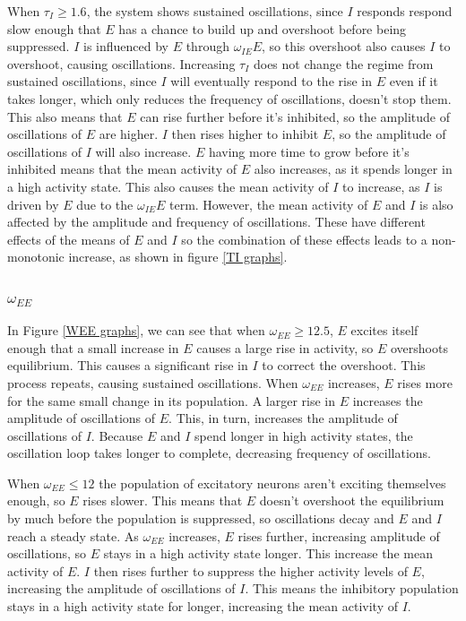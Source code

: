 \documentclass[10pt]{article}
\begin{document}
\begin{flushleft}
When $\tau_I \geq 1.6$, the system shows sustained oscillations, since $I$ responds respond slow enough that $E$ has a chance to build up and overshoot before being suppressed. $I$ is influenced by $E$ through $\omega_{IE}E$, so this overshoot also causes $I$ to overshoot, causing oscillations. Increasing $\tau_I$ does not change the regime from sustained oscillations, since $I$ will eventually respond to the rise in $E$ even if it takes longer, which only reduces the frequency of oscillations, doesn't stop them. This also means that $E$ can rise further before it's inhibited, so the amplitude of oscillations of $E$ are higher. $I$ then rises higher to inhibit $E$, so the amplitude of oscillations of $I$ will also increase. $E$ having more time to grow before it's inhibited means that the mean activity of $E$ also increases, as it spends longer in a high activity state. This also causes the mean activity of $I$ to increase, as $I$ is driven by $E$ due to the $\omega_{IE}E$ term. However, the mean activity of $E$ and $I$ is also affected by the amplitude and frequency of oscillations. These have different effects of the means of $E$ and $I$ so the combination of these effects leads to a non-monotonic increase, as shown in figure \ref{TI graphs}.


\subsubsection{$\omega_{EE}$}

\begin{flushleft}
    In Figure \ref{WEE graphs}, we can see that when $\omega_{EE} \geq 12.5$, $E$ excites itself enough that a small increase in $E$ causes a large rise in activity, so $E$ overshoots equilibrium. This causes a significant rise in $I$ to correct the overshoot. This process repeats, causing sustained oscillations. When $\omega_{EE}$ increases, $E$ rises more for the same small change in its population. A larger rise in $E$ increases the amplitude of oscillations of $E$. This, in turn, increases the amplitude of oscillations of $I$. Because $E$ and $I$ spend longer in high activity states, the oscillation loop takes longer to complete, decreasing frequency of oscillations.
    \newline
    
    When $\omega_{EE} \leq 12$ the population of excitatory neurons aren't exciting themselves enough, so $E$ rises slower. This means that $E$ doesn't overshoot the equilibrium by much before the population is suppressed, so oscillations decay and $E$ and $I$ reach a steady state. As $\omega_{EE}$ increases, $E$ rises further, increasing amplitude of oscillations, so $E$ stays in a high activity state longer. This increase the mean activity of $E$. $I$ then rises further to suppress the higher activity levels of $E$, increasing the amplitude of oscillations of $I$. This means the inhibitory population stays in a high activity state for longer, increasing the mean activity of $I$.
    \newline
    

\end{flushleft}
\end{flushleft}
\end{document}
